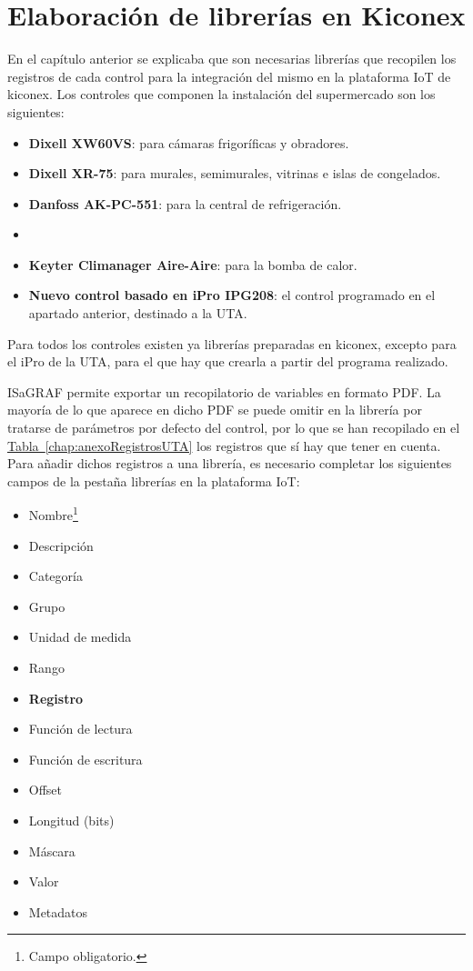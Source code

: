 \section{Elaboración de librerías en Kiconex}
\label{sec:librerias}
En el capítulo anterior se explicaba que son necesarias librerías que recopilen los registros de cada control para la integración del mismo en la plataforma IoT de kiconex. Los controles que componen la instalación del supermercado son los siguientes:

\begin{itemize}
  \item \textbf{Dixell XW60VS}: para cámaras frigoríficas y obradores.
  \item \textbf{Dixell XR-75}: para murales, semimurales, vitrinas e islas de congelados.
  \item \textbf{Danfoss AK-PC-551}: para la central de refrigeración.
  \item \item \textbf{Keyter Climanager Aire-Aire}: para la bomba de calor.
  \item \textbf{Nuevo control basado en iPro IPG208}: el control programado en el apartado anterior, destinado a la UTA.
\end{itemize}

Para todos los controles existen ya librerías preparadas en kiconex, excepto para el iPro de la UTA, para el que hay que crearla a partir del programa realizado. 

ISaGRAF permite exportar un recopilatorio de variables en formato PDF. La mayoría de lo que aparece en dicho PDF se puede omitir en la librería por tratarse de parámetros por defecto del control, por lo que se han recopilado en el \hyperref[chap:anexoRegistrosUTA]{Tabla~\ref{chap:anexoRegistrosUTA}} los registros que sí hay que tener en cuenta. Para añadir dichos registros a una librería, es necesario completar los siguientes campos de la pestaña librerías en la plataforma IoT:

\begin{itemize}
  \item Nombre\footnote[1]{Campo obligatorio.}
  \item Descripción\footnotemark[1]
  \item Categoría\footnotemark[1]
  \item Grupo
  \item Unidad de medida
  \item Rango
  \item \textbf{Registro\footnotemark[1]}
  \item Función de lectura
  \item Función de escritura
  \item Offset
  \item Longitud (bits)\footnotemark[1]
  \item Máscara
  \item Valor
  \item Metadatos
\end{itemize}

